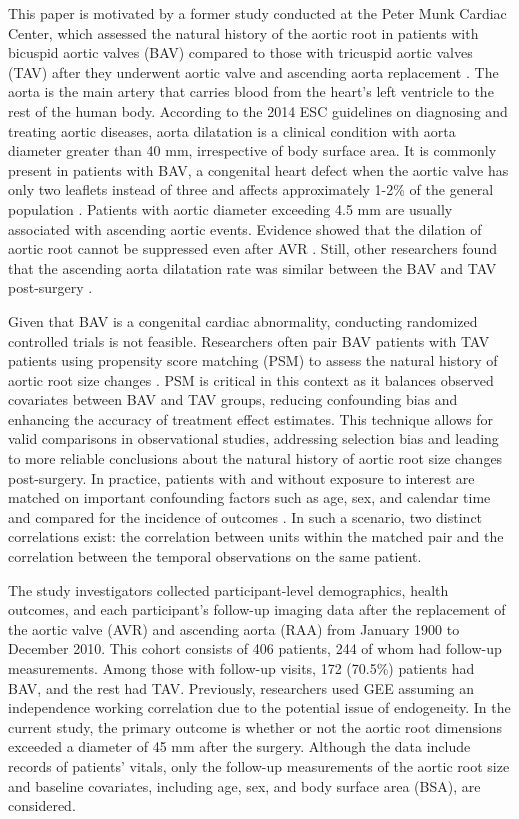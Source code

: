 \documentclass[
]{aft}
\begin{document}
This paper is motivated by a former study conducted at the Peter Munk
Cardiac Center, which assessed the natural history of the aortic root in
patients with bicuspid aortic valves (BAV) compared to those with
tricuspid aortic valves (TAV) after they underwent aortic valve and
ascending aorta replacement \citep{Hui2018}. The aorta is the main
artery that carries blood from the heart's left ventricle to the rest of
the human body. According to the 2014 ESC guidelines on diagnosing and
treating aortic diseases, aorta dilatation is a clinical condition with
aorta diameter greater than 40 mm, irrespective of body surface area. It
is commonly present in patients with BAV, a congenital heart defect when
the aortic valve has only two leaflets instead of three and affects
approximately 1-2\% of the general population \citep{Wang2021}. Patients
with aortic diameter exceeding 4.5 mm are usually associated with
ascending aortic events. Evidence showed that the dilation of aortic
root cannot be suppressed even after AVR \citep{Bruce2003}. Still, other
researchers found that the ascending aorta dilatation rate was similar
between the BAV and TAV post-surgery \citep{KIM202053}.

Given that BAV is a congenital cardiac abnormality, conducting
randomized controlled trials is not feasible. Researchers often pair BAV
patients with TAV patients using propensity score matching (PSM) to
assess the natural history of aortic root size changes
\citep{pairBAVTAV}. PSM is critical in this context as it balances
observed covariates between BAV and TAV groups, reducing confounding
bias and enhancing the accuracy of treatment effect estimates. This
technique allows for valid comparisons in observational studies,
addressing selection bias and leading to more reliable conclusions about
the natural history of aortic root size changes post-surgery. In
practice, patients with and without exposure to interest are matched on
important confounding factors such as age, sex, and calendar time and
compared for the incidence of outcomes \citep{Iwagami2022}. In such a
scenario, two distinct correlations exist: the correlation between units
within the matched pair and the correlation between the temporal
observations on the same patient.

The study investigators collected participant-level demographics, health
outcomes, and each participant's follow-up imaging data after the
replacement of the aortic valve (AVR) and ascending aorta (RAA) from
January 1900 to December 2010. This cohort consists of 406 patients, 244
of whom had follow-up measurements. Among those with follow-up visits,
172 (70.5\%) patients had BAV, and the rest had TAV. Previously,
researchers used GEE assuming an independence working correlation due to
the potential issue of endogeneity. In the current study, the primary
outcome is whether or not the aortic root dimensions exceeded a diameter
of 45 mm after the surgery. Although the data include records of
patients' vitals, only the follow-up measurements of the aortic root
size and baseline covariates, including age, sex, and body surface area
(BSA), are considered.
\end{document}
